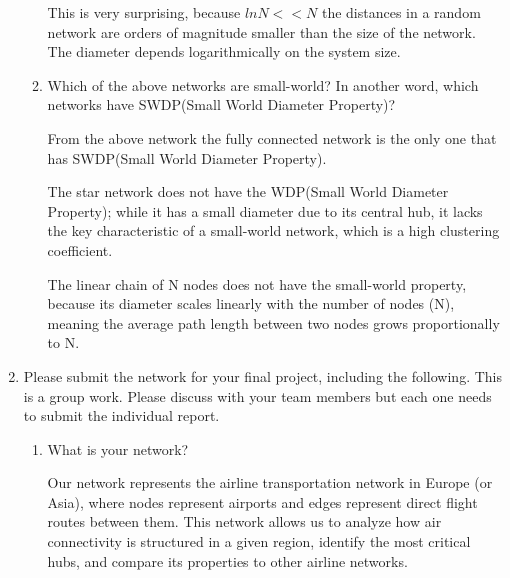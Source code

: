\documentclass{amsart}
\theoremstyle{definition}
\theoremstyle{remark}
\numberwithin{equation}{section}
\begin{document}
\begin{enumerate}
\begin{enumerate}
\vspace{0.2cm}

This is very surprising, because $ ln N << N$ the distances in a random network are orders of magnitude smaller than the size of the network. The diameter depends logarithmically on the system size.


\vspace{1cm}
\item Which of the above networks are small-world? In another word, which networks have SWDP(Small World Diameter Property)?

\vspace{0.2cm}

From the above network the fully connected network is the only one that has SWDP(Small World Diameter Property).

\vspace{0.2cm}

The star network does not have the WDP(Small World Diameter Property); while it has a small diameter due to its central hub, it lacks the key characteristic of a small-world network, which is a high clustering coefficient.

\vspace{0.2cm}

The linear chain of N nodes does not have the small-world property, because its diameter scales linearly with the number of nodes (N), meaning the average path length between two nodes grows proportionally to N.

\vspace{0.2cm}

\end{enumerate}

\clearpage
\item Please submit the network for your final project, including the following. This is a group work. Please discuss with your team members but each one needs to submit the individual report. 
\begin{enumerate}
\item What is your network? \vspace{0.5cm}

Our network represents the airline transportation network in Europe (or Asia), where nodes represent airports and edges represent direct flight routes between them.
This network allows us to analyze how air connectivity is structured in a given region, identify the most critical hubs, and compare its properties to other airline networks.


\end{enumerate}
\end{enumerate}
\end{document}
